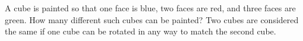 A cube is painted so that one face is blue, two faces are red, and three faces are green. How many different such cubes can be painted? Two cubes are considered the same if one cube can be rotated in any way to match the second cube.

